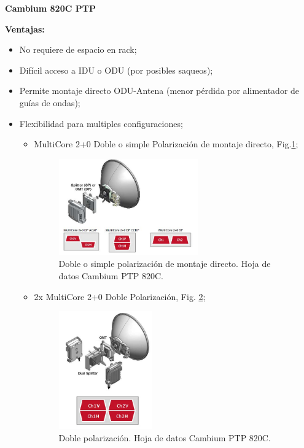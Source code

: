\documentclass[12pt,a4paper]{book}
\begin{document}
\textbf{Cambium 820C PTP}


\textbf{Ventajas:}

\begin{itemize}
\item No requiere de espacio en rack;
\item Difícil acceso a IDU o ODU (por posibles saqueos);
\item Permite montaje directo ODU-Antena (menor pérdida por alimentador de guías de ondas);
\item Flexibilidad para multiples configuraciones;
	\begin{itemize}
	\item MultiCore 2+0 Doble o simple Polarización de montaje directo, Fig.\ref{fig_cambium_1};
	
\begin{figure} [H]
\centering
\includegraphics[width= 6cm]{../figuras/cambium_1.jpg}
\caption{Doble o simple polarización de montaje directo. Hoja de datos Cambium PTP 820C.}
\label{fig_cambium_1}
\end{figure}
	
	\item 2x MultiCore 2+0 Doble Polarización, Fig. \ref{fig_cambium_2};
\begin{figure} [H]
\centering
\includegraphics[width= 4cm]{../figuras/cambium_2.jpg}
\caption{Doble polarización. Hoja de datos Cambium PTP 820C.}
\label{fig_cambium_2}
\end{figure}	


\end{itemize}
\end{itemize}
\end{document}

